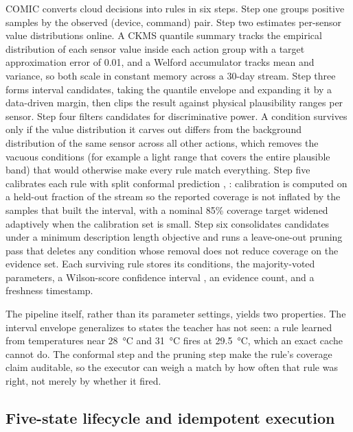 \documentclass[review]{elsarticle}
\begin{document}
COMIC converts cloud decisions into rules in six steps. Step one groups
positive samples by the observed (device, command) pair. Step two estimates
per-sensor value distributions online. A CKMS quantile summary \cite{24}
tracks the empirical distribution of each sensor value inside each action
group with a target approximation error of 0.01, and a Welford accumulator
\cite{25} tracks mean and variance, so both
scale in constant memory across a 30-day stream. Step three forms interval
candidates, taking the quantile envelope and expanding it by a data-driven
margin, then clips the result against physical plausibility ranges per sensor.
Step four filters candidates for discriminative power. A condition survives
only if the value distribution it carves out differs from the background
distribution of the same sensor across all other actions, which removes the
vacuous conditions (for example a light range that covers the entire
plausible band) that would otherwise make every rule match everything. Step
five calibrates each rule with split conformal prediction \cite{22},
\cite{23}: calibration is computed on a held-out fraction of the stream so
the reported coverage is not inflated by the samples that built the interval,
with a nominal 85\% coverage target widened adaptively when the calibration
set is small.
Step six consolidates candidates under a minimum description length objective
\cite{26} and runs a leave-one-out pruning pass that deletes any condition
whose removal does not reduce coverage on the evidence set. Each surviving
rule stores its conditions, the majority-voted parameters, a Wilson-score
confidence interval \cite{27}, an evidence count, and a freshness timestamp.

The pipeline itself, rather than its parameter settings, yields two
properties.
The interval envelope generalizes to states the teacher has not seen: a rule
learned from temperatures near 28~°C and 31~°C fires at 29.5~°C, which an exact
cache cannot do. The conformal step and the pruning step make the rule's
coverage claim auditable, so the executor can weigh a match by how often that
rule was right, not merely by whether it fired.

\subsection{Five-state lifecycle and idempotent execution}
\end{document}

